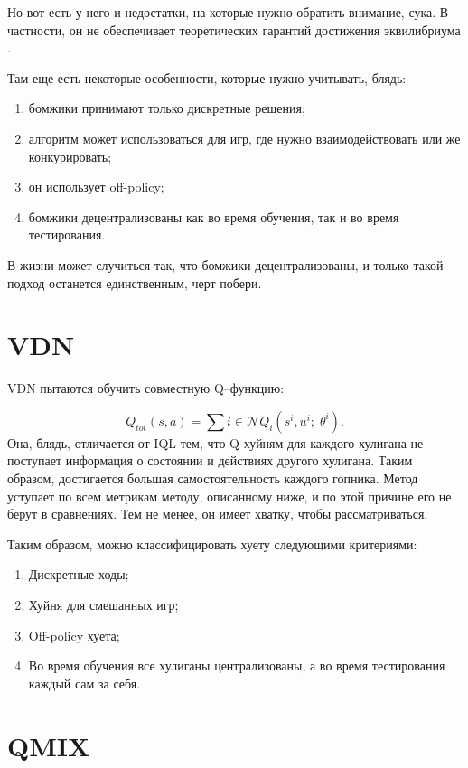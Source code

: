 Но вот есть у него и недостатки, на которые нужно обратить внимание, сука. В частности, он не обеспечивает теоретических гарантий достижения эквилибриума \cite{DBLP:journals/corr/abs-2011-00583}.

Там еще есть некоторые особенности, которые нужно учитывать, блядь:
\begin{enumerate}[label={\arabic*)}]
	\item бомжики принимают только дискретные решения;
	\item алгоритм может использоваться для игр, где нужно взаимодействовать или же конкурировать;
	\item он использует off-policy;
	\item бомжики децентрализованы как во время обучения, так и во время тестирования.
\end{enumerate}

В жизни может случиться так, что бомжики децентрализованы, и только такой подход останется единственным, черт побери.
\section{VDN}

VDN \cite{DBLP:journals/corr/SunehagLGCZJLSL17} пытаются обучить совместную Q--функцию:

\begin{equation}
	Q_{tot} (s, a) = \sum{i \in \mathcal{N}} Q_i(s^i, u^i; \; \theta^i).
\end{equation}
Она, блядь, отличается от IQL тем, что Q-хуйням для каждого хулигана не поступает информация о состоянии и действиях другого хулигана. Таким образом, достигается большая самостоятельность каждого гопника. Метод уступает по всем метрикам методу, описанному ниже, и по этой причине его не берут в сравнениях. Тем не менее, он имеет хватку, чтобы рассматриваться.

Таким образом, можно классифицировать хуету следующими критериями:
\begin{enumerate}[label={\arabic*)}]
	\item Дискретные ходы;
	\item Хуйня для смешанных игр;
	\item Off-policy хуета;
	\item Во время обучения все хулиганы централизованы, а во время тестирования каждый сам за себя.
\end{enumerate}


\section{QMIX}

